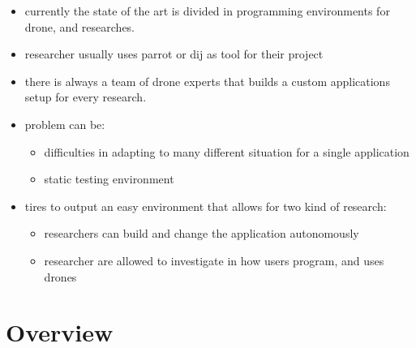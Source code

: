 \begin{itemize}
    \item currently the state of the art is divided in programming environments for drone, and \hdi{} researches.
    \item \hdi{} researcher usually uses parrot or dij as tool for their project
    \item there is always a team of drone experts that builds a custom applications setup for every \hdi{} research.
    \item problem can be:
          \begin{itemize}
              \item difficulties in adapting to many different situation for a single application
              \item static testing environment
          \end{itemize}
    \item \easyfly{} tires to output an easy environment that allows for two kind of research:
          \begin{itemize}
              \item researchers can build and change the application autonomously
              \item researcher are allowed to investigate in how users program, and uses drones
          \end{itemize}
\end{itemize}



\section{Overview}\label{sec:intro_overview}